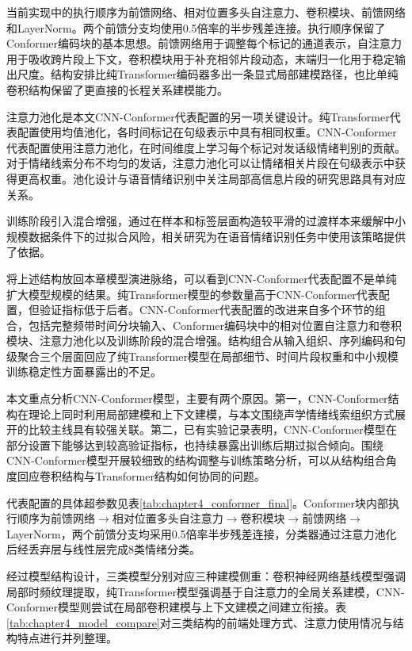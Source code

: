 当前实现中的执行顺序为前馈网络、相对位置多头自注意力、卷积模块、前馈网络和LayerNorm。两个前馈分支均使用0.5倍率的半步残差连接。执行顺序保留了Conformer编码块的基本思想。前馈网络用于调整每个标记的通道表示，自注意力用于吸收跨片段上下文，卷积模块用于补充相邻片段动态，末端归一化用于稳定输出尺度。结构安排比纯Transformer编码器多出一条显式局部建模路径，也比单纯卷积结构保留了更直接的长程关系建模能力。

注意力池化是本文CNN-Conformer代表配置的另一项关键设计。纯Transformer代表配置使用均值池化，各时间标记在句级表示中具有相同权重。CNN-Conformer代表配置使用注意力池化，在时间维度上学习每个标记对发话级情绪判别的贡献。对于情绪线索分布不均匀的发话，注意力池化可以让情绪相关片段在句级表示中获得更高权重。池化设计与语音情绪识别中关注局部高信息片段的研究思路具有对应关系\cite{mirsamadi2017automatic,peng2021efficient}。

训练阶段引入混合增强，通过在样本和标签层面构造较平滑的过渡样本来缓解中小规模数据条件下的过拟合风险，相关研究为在语音情绪识别任务中使用该策略提供了依据\cite{kang2023labelmixup}。


将上述结构放回本章模型演进脉络，可以看到CNN-Conformer代表配置不是单纯扩大模型规模的结果。纯Transformer模型的参数量高于CNN-Conformer代表配置，但验证指标低于后者。CNN-Conformer代表配置的改进来自多个环节的组合，包括完整频带时间分块输入、Conformer编码块中的相对位置自注意力和卷积模块、注意力池化以及训练阶段的混合增强。结构组合从输入组织、序列编码和句级聚合三个层面回应了纯Transformer模型在局部细节、时间片段权重和中小规模训练稳定性方面暴露出的不足。

本文重点分析CNN-Conformer模型，主要有两个原因。第一，CNN-Conformer结构在理论上同时利用局部建模和上下文建模，与本文围绕声学情绪线索组织方式展开的比较主线具有较强关联。第二，已有实验记录表明，CNN-Conformer模型在部分设置下能够达到较高验证指标，也持续暴露出训练后期过拟合倾向。围绕CNN-Conformer模型开展较细致的结构调整与训练策略分析，可以从结构组合角度回应卷积结构与Transformer结构如何协同的问题。

代表配置的具体超参数见表\ref{tab:chapter4_conformer_final}。Conformer块内部执行顺序为前馈网络$\rightarrow$相对位置多头自注意力$\rightarrow$卷积模块$\rightarrow$前馈网络$\rightarrow$LayerNorm，两个前馈分支均采用0.5倍率半步残差连接，分类器通过注意力池化后经丢弃层与线性层完成8类情绪分类\cite{gulati2020conformer,zou2022speech,peng2021efficient}。

经过模型结构设计，三类模型分别对应三种建模侧重：卷积神经网络基线模型强调局部时频纹理提取，纯Transformer模型强调基于自注意力的全局关系建模，CNN-Conformer模型则尝试在局部卷积建模与上下文建模之间建立衔接。表\ref{tab:chapter4_model_compare}对三类结构的前端处理方式、注意力使用情况与结构特点进行并列整理。

